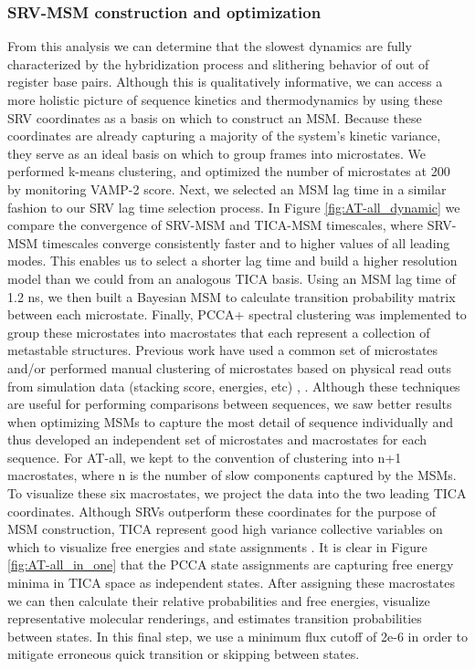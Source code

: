 \documentclass[journal=jpcbfk,manuscript=article]{achemso}
\begin{document}
\subsubsection{\label{sec:Results}SRV-MSM construction and optimization}

From this analysis we can determine that the slowest dynamics are fully characterized by the hybridization process and slithering behavior of out of register base pairs. Although this is qualitatively informative, we can access a more holistic picture of sequence kinetics and thermodynamics by using these SRV coordinates as a basis on which to construct an MSM. Because these coordinates are already capturing a majority of the system's kinetic variance, they serve as an ideal basis on which to group frames into microstates. We performed k-means clustering, and optimized the number of microstates at 200 by monitoring VAMP-2 score. Next, we selected an MSM lag time in a similar fashion to our SRV lag time selection process. In Figure \ref{fig:AT-all_dynamic} we compare the convergence of SRV-MSM and TICA-MSM timescales, where SRV-MSM timescales converge consistently faster and to higher values of all leading modes. This enables us to select a shorter lag time and build a higher resolution model than we could from an analogous TICA basis. Using an MSM lag time of 1.2 ns, we then built a Bayesian MSM to calculate transition probability matrix between each microstate. Finally, PCCA+ spectral clustering was implemented to group these microstates into macrostates that each represent a collection of metastable structures. Previous work have used a common set of microstates and/or performed manual clustering of microstates based on physical read outs from simulation data (stacking score, energies, etc) \citep{Pinamonti2017PredictingModels}, \citep{PinamontiAnalyzedModels}. Although these techniques are useful for performing comparisons between sequences, we saw better results when optimizing MSMs to capture the most detail of sequence individually and thus developed an independent set of microstates and macrostates for each sequence. For AT-all, we kept to the convention of clustering into n+1 macrostates, where n is the number of slow components captured by the MSMs. To visualize these six macrostates, we project the data into the two leading TICA coordinates. Although SRVs outperform these coordinates for the purpose of MSM construction, TICA represent good high variance collective variables on which to visualize free energies and state assignments \citep{Sidky}. It is clear in Figure \ref{fig:AT-all_in_one} that the PCCA state assignments are capturing free energy minima in TICA space as independent states. After assigning these macrostates we can then calculate their relative probabilities and free energies, visualize representative molecular renderings, and estimates transition probabilities between states. In this final step, we use a minimum flux cutoff of 2e-6 in order to mitigate erroneous quick transition or skipping between states. 
\end{document}
